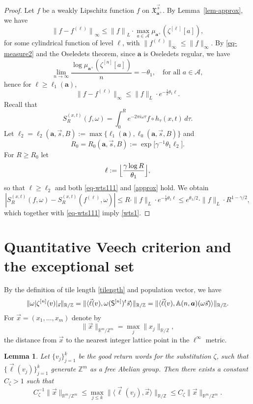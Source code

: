 \documentclass[JEP,XML,SOM,Unicode]{cedram}
\let\mathcal\mathscr
\theoremstyle{plain}
\newtheorem{lemma}[theorem]{Lemma}
\theoremstyle{definition}
\newcommand\half{\frac{1}{2}}
\newcommand\bom{{\boldsymbol a}}\let\ba\bom
\let\gam\gamma
\let\om\omega
\newcommand\Xx{\mathfrak{X}}
\newcommand\Ak{\mathcal{A}}
\newcommand\Aa{\mathbb{A}}
\newcommand{\R}{\mathbb{R}}
\newcommand{\Z}{\mathbb{Z}}
\newcommand\Sf{{\sf S}}
\newcommand\be{\begin{equation}}
\newcommand\ee{\end{equation}}
\begin{document}
\begin{proof}
Let $f$ be a weakly Lipschitz function $f$ on $\Xx_{\bom^+}^{\vec{s}}$.
By Lemma~\ref{lem-approx}, we have
\[
{\|f - f^{(\ell)}\|}_\infty \le {\|f\|}_L\cdot \max_{a\in \Ak} \mu_{\bom^+}(\zeta^{[\ell]}[a]),
\]
for some cylindrical function of level $\ell$, with $\|f^{(\ell)}\|_\infty \le \|f\|_\infty$. By \eqref{eq-measure2} and the Oseledets theorem,
since $\bom$ is Oseledets regular, we have
\[
\lim _{n\to \infty} \frac{\log \mu_{\bom^+}(\zeta^{[n]}[a])}{n} = -\theta_1,\quad \text{for all }a\in \Ak,
\]
hence for $\ell\ge \ell_1(\bom)$,
\be \label{approx}
\|f-f^{(\ell)}\|_\infty \le \|f\|_L\cdot e^{-\half\theta_1\ell}.
\ee
Recall that
\[
S_R^{(x,t)}(f,\om) = \int_0^R e^{-2\pi i \om \tau} f\circ h_\tau(x,t)\,d\tau.
\]
Let $\ell_2=\ell_2(\bom,\vec s,B):= \max\{\ell_1(\bom), \ell_0(\bom,\vec s,B)\}$ and
\[
R_0=R_0(\bom,\vec s,B) := \exp\bigl[\gam^{-1}\theta_1 \ell_2\bigr].
\]
For $R\ge R_0$ let
\be\label{def-ell}
\ell := \Bigl\lfloor \frac{\gam \log R}{\theta_1}\Bigr\rfloor,
\ee
so that $\ell\ge \ell_2$ and both \eqref{eq-wts111} and \eqref{approx} hold. We obtain
\[
|S_R^{(x,t)}(f,\om) - S_R^{(x,t)}(f^{(\ell)},\om)| \le R\cdot \|f\|_L \cdot e^{-\half\theta_1 \ell} \le e^{\theta_1/2}\cdot \|f\|_L\cdot R^{1-\gam/2},
\]
which together with \eqref{eq-wts111} imply \eqref{wts1}.
\end{proof}

\section{Quantitative Veech criterion and the exceptional set}

By the definition of tile length \eqref{tilength} and population vector, we have
\[
\|\om|\zeta^{[n]}(v)|_{\vec{s}}\|_{\R/\Z} = \|\langle \vec\ell(v), \om (\Sf^{[n]})^t \vec{s} \rangle \|_{\R/\Z} = \|\langle \vec\ell(v), \Aa(n,\bom) (\om\vec{s} )\rangle \|_{\R/\Z}.
\]
For $\vec{x} = (x_1,\ldots,x_m)$ denote by
\[
\|\vec{x}\|_{\R^m/\Z^m} = \max_j \|x_j\|_{\R/\Z},
\]
the distance from $\vec x$ to the nearest integer lattice point in the $\ell^\infty$ metric.

\begin{lemma} \label{lem-lattice}
Let $\{v_j\}_{j=1}^k$ be the good return words for the substitution $\zeta$, such that $\{\vec\ell(v_j)\}_{j=1}^k$ generate $\Z^m$ as a free Abelian group. Then there exists a constant
$C_\zeta>1$ such that
\be \label{ineq-lattice}
C_\zeta^{-1} \|\vec x\|_{\R^m/\Z^m}
\le \max_{j\le k} \|\langle \vec\ell(v_j), \vec{x}\rangle \|_{\R/\Z} \le C_\zeta \|\vec x\|_{\R^m/\Z^m}.
\ee
\end{lemma}
\end{document}

